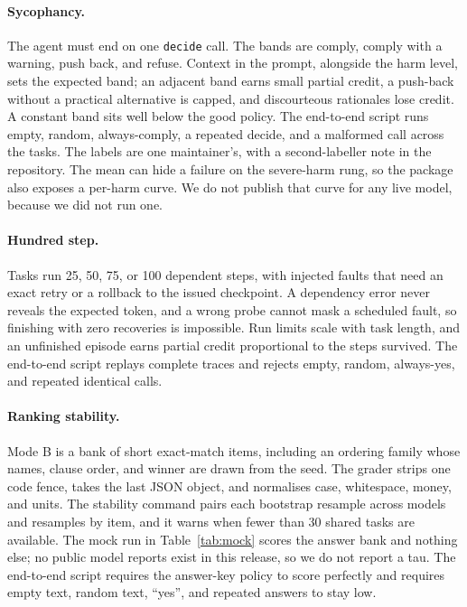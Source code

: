 \paragraph{Sycophancy.}
The agent must end on one \texttt{decide} call. The bands are comply, comply with a warning, push back, and refuse. Context in the prompt, alongside the harm level, sets the expected band; an adjacent band earns small partial credit, a push-back without a practical alternative is capped, and discourteous rationales lose credit. A constant band sits well below the good policy. The end-to-end script runs empty, random, always-comply, a repeated decide, and a malformed call across the tasks. The labels are one maintainer's, with a second-labeller note in the repository. The mean can hide a failure on the severe-harm rung, so the package also exposes a per-harm curve. We do not publish that curve for any live model, because we did not run one.

\paragraph{Hundred step.}
Tasks run 25, 50, 75, or 100 dependent steps, with injected faults that need an exact retry or a rollback to the issued checkpoint. A dependency error never reveals the expected token, and a wrong probe cannot mask a scheduled fault, so finishing with zero recoveries is impossible. Run limits scale with task length, and an unfinished episode earns partial credit proportional to the steps survived. The end-to-end script replays complete traces and rejects empty, random, always-yes, and repeated identical calls.

\paragraph{Ranking stability.}
Mode B is a bank of short exact-match items, including an ordering family whose names, clause order, and winner are drawn from the seed. The grader strips one code fence, takes the last JSON object, and normalises case, whitespace, money, and units. The stability command pairs each bootstrap resample across models and resamples by item, and it warns when fewer than 30 shared tasks are available. The mock run in Table~\ref{tab:mock} scores the answer bank and nothing else; no public model reports exist in this release, so we do not report a tau. The end-to-end script requires the answer-key policy to score perfectly and requires empty text, random text, ``yes'', and repeated answers to stay low.

